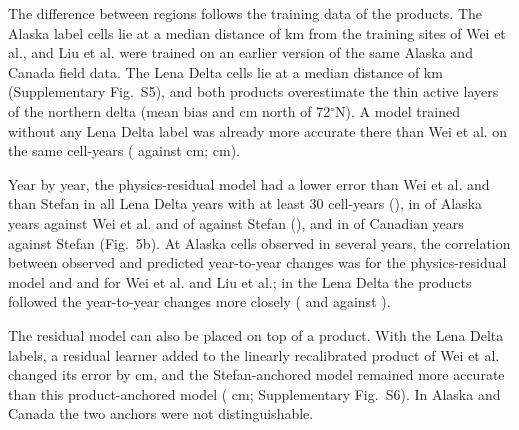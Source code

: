 The difference between regions follows the training data of the products. The Alaska label cells lie at a median distance of \ndistweiAkmed{} km from the training sites of Wei et al., and Liu et al. were trained on an earlier version of the same Alaska and Canada field data. The Lena Delta cells lie at a median distance of \ndistweiLemed{} km (Supplementary Fig.~S5), and both products overestimate the thin active layers of the northern delta (mean bias \nbiasLeNorthWei{} and \nbiasLeNorthLiu{} cm north of 72$^\circ$N). A model trained without any Lena Delta label was already more accurate there than Wei et al. on the same cell-years (\ntlvprmseLeRsWeizero{} against \ntlvprmseLeWeizero{} cm; \ntlvpLeRsWeizero{} cm).

Year by year, the physics-residual model had a lower error than Wei et al. and than Stefan in all \nywLen{} Lena Delta years with at least 30 cell-years (\nyrsywLe), in \nywAkRoWeiwin{} of \nywAkRoWein{} Alaska years against Wei et al. and \nywAkRoPowin{} of \nywAkRoPon{} against Stefan (\nyrsywAk), and in \nywCaRoPowin{} of \nywCaRoPon{} Canadian years against Stefan (Fig.~5b). At Alaska cells observed in several years, the correlation between observed and predicted year-to-year changes was \nrdeltaAkRo{} for the physics-residual model and \nrdeltaAkWei{} and \nrdeltaAkLiu{} for Wei et al. and Liu et al.; in the Lena Delta the products followed the year-to-year changes more closely (\nrdeltaLeWei{} and \nrdeltaLeLiu{} against \nrdeltaLeRo).

The residual model can also be placed on top of a product. With the Lena Delta labels, a residual learner added to the linearly recalibrated product of Wei et al. changed its error by \npadLeRpPcal{} cm, and the Stefan-anchored model remained more accurate than this product-anchored model (\npadLeRoRp{} cm; Supplementary Fig.~S6). In Alaska and Canada the two anchors were not distinguishable.

